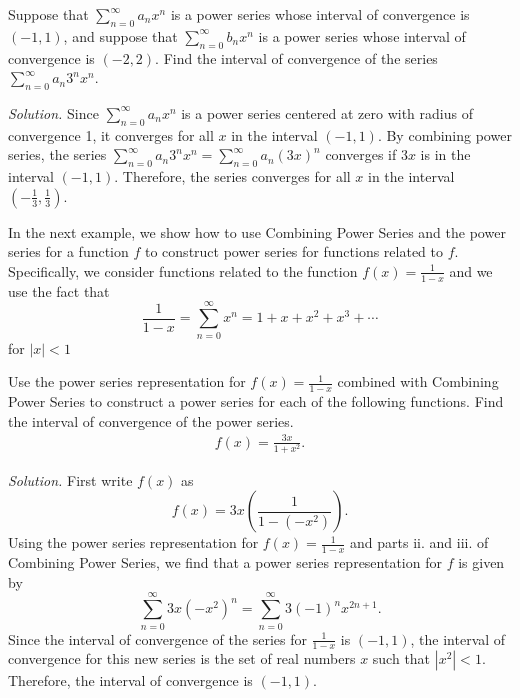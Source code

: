 \documentclass{report}
\begin{document}
    \bigbreak \noindent 
    \begin{exm}
        Suppose that \(\sum_{n=0}^{\infty} a_n x^n\) is a power series whose interval of convergence is \((-1, 1)\), and suppose that \(\sum_{n=0}^{\infty} b_n x^n\) is a power series whose interval of convergence is \((-2, 2)\).
        \bigbreak \noindent 
        Find the interval of convergence of the series \(\sum_{n=0}^{\infty} a_n 3^n x^n\).
    \end{exm}
    \bigbreak \noindent 
    \textit{Solution.} Since \(\sum_{n=0}^{\infty} a_n x^n\) is a power series centered at zero with radius of convergence 1, it converges for all \(x\) in the interval \((-1, 1)\). By combining power series, the series \(\sum_{n=0}^{\infty} a_n 3^n x^n = \sum_{n=0}^{\infty} a_n (3x)^n\) converges if \(3x\) is in the interval \((-1, 1)\). Therefore, the series converges for all \(x\) in the interval \(\left(-\frac{1}{3}, \frac{1}{3}\right)\).

    \pagebreak \bigbreak \noindent 
    In the next example, we show how to use Combining Power Series and the power series for a function \( f \) to construct power series for functions related to \( f \). Specifically, we consider functions related to the function \( f(x) = \frac{1}{1 - x} \) and we use the fact that
    \[
    \frac{1}{1 - x} = \sum_{n=0}^{\infty} x^n = 1 + x + x^2 + x^3 + \cdots
    \]
    for \( |x| < 1 \)

    \bigbreak \noindent 
    \begin{exm}
        Use the power series representation for \( f(x) = \frac{1}{1 - x} \) combined with Combining Power Series to construct a power series for each of the following functions. Find the interval of convergence of the power series.
        \begin{align*}
            f(x) = \frac{3x}{1+x^{2}}
        .\end{align*}
        
    \end{exm}
    \bigbreak \noindent 
    \textit{Solution.} First write \( f(x) \) as
    \[ f(x) = 3x \left( \frac{1}{1 - (-x^2)} \right). \]
    Using the power series representation for \( f(x) = \frac{1}{1 - x} \) and parts ii. and iii. of Combining Power Series, we find that a power series representation for \( f \) is given by
    \[ \sum_{n=0}^{\infty} 3x(-x^2)^n = \sum_{n=0}^{\infty} 3(-1)^n x^{2n+1}. \]
    Since the interval of convergence of the series for \( \frac{1}{1 - x} \) is \((-1, 1)\), the interval of convergence for this new series is the set of real numbers \( x \) such that \( |x^2| < 1 \). Therefore, the interval of convergence is \((-1, 1)\).
\end{document}

